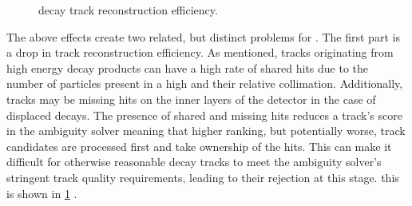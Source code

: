 \begin{figure}[!htbp]
  \centering
  \vspace{0.05em}
  \caption{\bhadron decay track reconstruction efficiency.}
  \label{fig:b_track_eff}
\end{figure}
%

The above effects create two related, but distinct problems for \btagging.
The first part is a drop in track reconstruction efficiency.
As mentioned, tracks originating from high energy \bhadron decay products can have a high rate of shared hits due to the number of particles present in a high \pT \bjet and their relative collimation.
Additionally, tracks may be missing hits on the inner layers of the detector in the case of displaced decays.
The presence of shared and missing hits reduces a track's score in the ambiguity solver meaning that higher ranking, but potentially worse, track candidates are processed first and take ownership of the hits.
This can make it difficult for otherwise reasonable \bhadron decay tracks to meet the ambiguity solver's stringent track quality requirements, leading to their rejection at this stage.
this is shown in \cref{fig:b_track_eff} .

